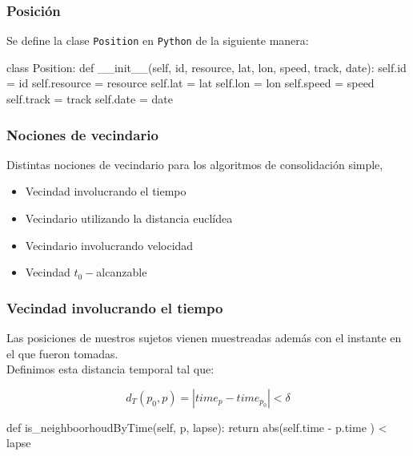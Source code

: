 \documentclass[10pt, spanish]{beamer}
\begin{document}

\begin{frame}[fragile]
\frametitle{Posici\'on}
Se define la clase \texttt{Position} en \texttt{Python} de la siguiente manera:\\
\bigskip
\begin{python}
class Position:
    def __init__(self, id, resource, lat, lon, speed, track, date):
        self.id = id
        self.resource = resource
        self.lat = lat
        self.lon = lon
        self.speed = speed
        self.track = track
        self.date = date
\end{python}
\end{frame}


\begin{frame}[fragile]
\frametitle{Nociones de vecindario}

Distintas nociones de vecindario para los algoritmos de consolidaci\'on simple,
\begin{itemize}
	\item Vecindad involucrando el tiempo
	\item Vecindario utilizando la distancia eucl\'idea
	\item Vecindario involucrando velocidad
	\item Vecindad $t_0-$alcanzable
\end{itemize}
\end{frame}


\begin{frame}[fragile]
\frametitle{Vecindad involucrando el tiempo}
Las posiciones de nuestros sujetos vienen muestreadas adem\'as con el instante en el que fueron tomadas.\\ \bigskip
Definimos esta distancia temporal tal que:

$$ d_T(p_0, p) = |time_p - time_{p_0}| < \delta $$

\bigskip

\begin{python}
    def is_neighboorhoudByTime(self, p, lapse):
        return abs(self.time - p.time ) < lapse
\end{python}

\end{frame}
\end{document}
